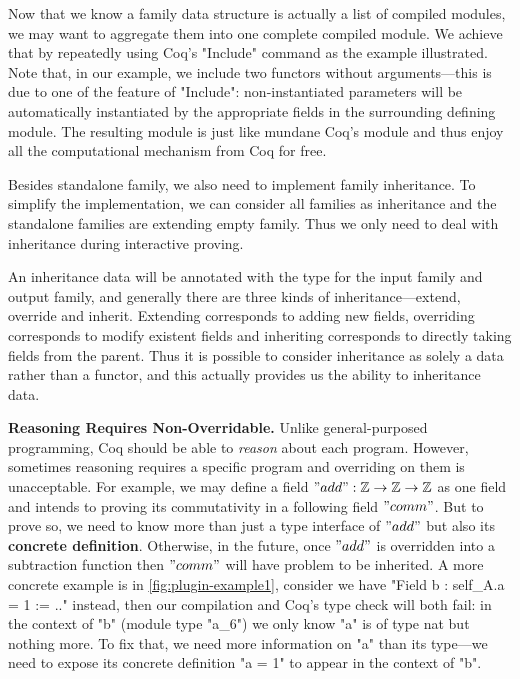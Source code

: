 Now that we know a family data structure is actually a list of compiled modules, we may want to aggregate them into one complete compiled module. We achieve that by repeatedly using Coq's "Include" command as the example illustrated. Note that, in our example, we include two functors without arguments---this is due to one of the feature of "Include": non-instantiated parameters will be automatically instantiated by the appropriate fields in the surrounding defining module. The resulting module is just like mundane Coq's module and thus enjoy all the computational mechanism from Coq for free. 



Besides standalone family, we also need to implement family inheritance. To simplify the implementation, we can consider all families as inheritance and the standalone families are extending empty family. Thus we only need to deal with inheritance during interactive proving. 

An inheritance data will be annotated with the type for the input family and output family, and generally there are three kinds of inheritance---extend, override and inherit. Extending corresponds to adding new fields, overriding corresponds to modify existent fields and inheriting corresponds to directly taking fields from the parent. Thus it is possible to consider inheritance as solely a data rather than a functor, and this actually provides us the ability to  inheritance data. 




\textbf{Reasoning Requires Non-Overridable.}
Unlike general-purposed programming, Coq should be able to  \textit{reason} about each program. However, sometimes reasoning requires a specific program and overriding on them is unacceptable. For example, we may define a field $"add" : \mathbb{Z} \to \mathbb{Z} \to \mathbb{Z}$ as one field and intends to proving its commutativity in a following field $"comm"$. But to prove so, we need to know more than just a type interface of $"add"$ but also its \textbf{concrete definition}. Otherwise, in the future, once $"add"$ is overridden into a subtraction function then $"comm"$ will have problem to be  inherited. A more concrete example is in \cref{fig:plugin-example1}, consider we have "Field b : self_A.a = 1 := .." instead, then our compilation and Coq's type check will both fail: in the context of "b" (module type "a_6") we only know "a" is of type nat but nothing more.  To fix that, we need more information on "a" than its type---we need to expose its concrete definition "a = 1" to appear in the context of "b".

